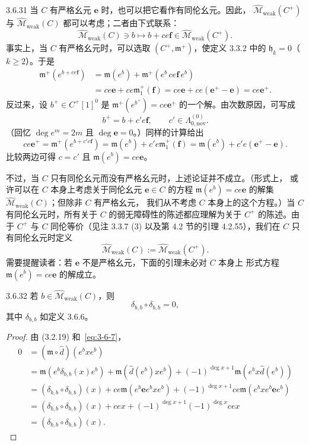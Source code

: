 \begin{remark}{3.6.31}\label{rem:3-6-31}
当 $C$ 有严格幺元 $\mathbf e$ 时，也可以把它看作有同伦幺元。因此，
$\widehat{\mathcal M}_{\mathrm{weak}}(C^+)$ 与
$\widehat{\mathcal M}_{\mathrm{weak}}(C)$ 都可以考虑；二者由下式联系：
\[
  \widehat{\mathcal M}_{\mathrm{weak}}(C)\ni b
  \longmapsto b+ce\mathbf f
  \in\widehat{\mathcal M}_{\mathrm{weak}}(C^+).
\]
事实上，当 $C$ 有严格幺元时，可以选取 $(C^+,\mathfrak m^+)$，使定义
3.3.2 中的 $\mathfrak h_k=0$（$k\geq2$）。于是
\[
\begin{aligned}
  \mathfrak m^+(e^{b+ce\mathbf f})
  &=\mathfrak m(e^b)
    +\mathfrak m^+(e^b\,ce\mathbf f\,e^b)\\
  &=ce\mathbf e+ce\mathfrak m_1^+(\mathbf f)
   =ce\mathbf e+ce(\mathbf e^+-\mathbf e)
   =ce\mathbf e^+.
\end{aligned}
\]
反过来，设 $b^+\in C^+[1]^0$ 是
$\mathfrak m^+(e^{b^+})=ce\mathbf e^+$ 的一个解。由次数原因，可写成
\[
  b^+=b+c'e\mathbf f,
  \qquad c'\in\Lambda_{0,\mathrm{nov}}^{(0)}.
\]
（回忆 $\deg e^m=2m$ 且 $\deg\mathbf e=0$。）同样的计算给出
\[
  ce\mathbf e^+
  =\mathfrak m^+(e^{b+c'e\mathbf f})
  =\mathfrak m(e^b)+c'e\mathfrak m_1^+(\mathbf f)
  =\mathfrak m(e^b)+c'e(\mathbf e^+-\mathbf e).
\]
比较两边可得 $c=c'$ 且 $\mathfrak m(e^b)=ce\mathbf e$。

不过，当 $C$ 只有同伦幺元而没有严格幺元时，上述论证并不成立。（形式上，
或许可以在 $C$ 本身上考虑关于同伦幺元 $\mathbf e\in C$ 的方程
$\mathfrak m(e^b)=ce\mathbf e$ 的解集
$\widehat{\mathcal M}_{\mathrm{weak}}(C)$；但除非 $C$ 有严格幺元，
我们从不考虑 $C$ 本身上的这个方程。）当 $C$ 有同伦幺元时，所有关于
$C$ 的弱无障碍性的陈述都应理解为关于 $C^+$ 的陈述。由于 $C^+$ 与 $C$
同伦等价（见注 3.3.7 (3) 以及第 4.2 节的引理 4.2.55），我们在 $C$
只有同伦幺元时定义
\[
  \widehat{\mathcal M}_{\mathrm{weak}}(C)
  :=\widehat{\mathcal M}_{\mathrm{weak}}(C^+).
\]
需要提醒读者：若 $\mathbf e$ 不是严格幺元，下面的引理未必对 $C$ 本身上
形式方程 $\mathfrak m(e^b)=ce\mathbf e$ 的解成立。
\end{remark}

\begin{lemma}{3.6.32}\label{lem:3-6-32}
若 $b\in\widehat{\mathcal M}_{\mathrm{weak}}(C)$，则
\[
  \delta_{b,b}\circ\delta_{b,b}=0,
\]
其中 $\delta_{b,b}$ 如定义 3.6.6。
\end{lemma}

\begin{proof}
由 (3.2.19) 和~\eqref{eq:3-6-7}，
\[
\begin{aligned}
0
&=(\mathfrak m\circ\widehat d)(e^bxe^b)\\
&=\mathfrak m(e^b\delta_{b,b}(x)e^b)
  +\mathfrak m(\widehat d(e^b)xe^b)
  +(-1)^{\deg x+1}\mathfrak m(e^bx\widehat d(e^b))\\
&=(\delta_{b,b}\circ\delta_{b,b})(x)
  +ce\mathfrak m(e^b\mathbf e e^bxe^b)
  +(-1)^{\deg x+1}ce\mathfrak m(e^bxe^b\mathbf e e^b)\\
&=(\delta_{b,b}\circ\delta_{b,b})(x)
  +cex+(-1)^{\deg x+1}(-1)^{\deg x}cex\\
&=(\delta_{b,b}\circ\delta_{b,b})(x).
\end{aligned}
\]
\end{proof}

